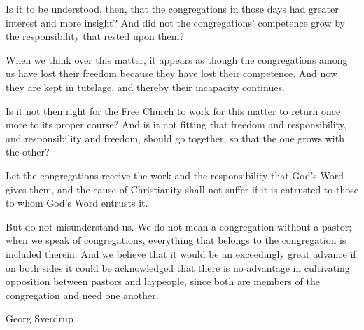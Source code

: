 Is it to be understood, then, that the congregations in those days had greater interest and more insight? And did not the congregations’ competence grow by the responsibility that rested upon them?

When we think over this matter, it appears as though the congregations among us have lost their freedom because they have lost their competence. And now they are kept in tutelage, and thereby their incapacity continues.

Is it not then right for the Free Church to work for this matter to return once more to its proper course? And is it not fitting that freedom and responsibility, and responsibility and freedom, should go together, so that the one grows with the other?

Let the congregations receive the work and the responsibility that God’s Word gives them, and the cause of Christianity shall not suffer if it is entrusted to those to whom God’s Word entrusts it.

But do not misunderstand us. We do not mean a congregation without a pastor; when we speak of congregations, everything that belongs to the congregation is included therein. And we believe that it would be an exceedingly great advance if on both sides it could be acknowledged that there is no advantage in cultivating opposition between pastors and laypeople, since both are members of the congregation and need one another.

Georg Sverdrup
